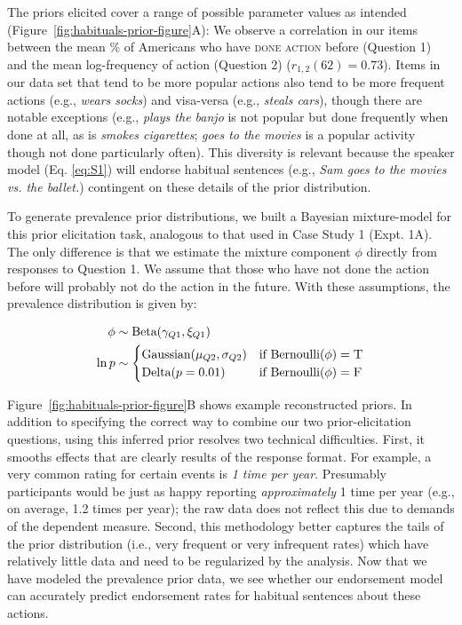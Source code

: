\documentclass[english,,man,floatsintext]{apa6}
\theoremstyle{definition}
\theoremstyle{definition}
\theoremstyle{definition}
\theoremstyle{remark}
\begin{document}
The priors elicited cover a range of possible parameter values as
intended (Figure~\ref{fig:habituals-prior-figure}A): We observe a
correlation in our items between the mean \% of Americans who have
\textsc{done action} before (Question 1) and the mean log-frequency of
action (Question 2) (\(r_{1,2}(62) = 0.73\)). Items in our data set that
tend to be more popular actions also tend to be more frequent actions
(e.g., \emph{wears socks}) and visa-versa (e.g., \emph{steals cars}),
though there are notable exceptions (e.g., \emph{plays the banjo} is not
popular but done frequently when done at all, as is
\emph{smokes cigarettes}; \emph{goes to the movies} is a popular
activity though not done particularly often). This diversity is relevant
because the speaker model (Eq. \ref{eq:S1}) will endorse habitual
sentences (e.g., \emph{Sam goes to the movies vs. the ballet.})
contingent on these details of the prior distribution.

To generate prevalence prior distributions, we built a Bayesian
mixture-model for this prior elicitation task, analogous to that used in
Case Study 1 (Expt. 1A). The only difference is that we estimate the
mixture component \(\phi\) directly from responses to Question 1. We
assume that those who have not done the action before will probably not
do the action in the future. With these assumptions, the prevalence
distribution is given by:

\begin{align}
\phi & \sim \text{Beta}(\gamma_{Q1}, \xi_{Q1}) \nonumber \\ 
\ln p & \sim \begin{cases}
        \text{Gaussian}(\mu_{Q2}, \sigma_{Q2}) &\mbox{if } \text{Bernoulli}(\phi) = \textsc{T} \label{eq:priorModel}  \\
                \text{Delta}(p=0.01) &\mbox{if } \text{Bernoulli}(\phi) = \textsc{F} \\
        \end{cases}
\end{align}

Figure~\ref{fig:habituals-prior-figure}B shows example reconstructed
priors. In addition to specifying the correct way to combine our two
prior-elicitation questions, using this inferred prior resolves two
technical difficulties. First, it smooths effects that are clearly
results of the response format. For example, a very common rating for
certain events is \emph{1 time per year}. Presumably participants would
be just as happy reporting \emph{approximately} 1 time per year (e.g.,
on average, 1.2 times per year); the raw data does not reflect this due
to demands of the dependent measure. Second, this methodology better
captures the tails of the prior distribution (i.e., very frequent or
very infrequent rates) which have relatively little data and need to be
regularized by the analysis. Now that we have modeled the prevalence
prior data, we see whether our endorsement model can accurately predict
endorsement rates for habitual sentences about these actions.
\end{document}

